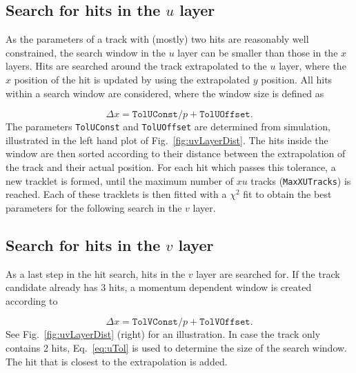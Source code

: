 \subsection[Search for hits in the $u$ layer]{Search for hits in the {\boldmath$u$} layer}
As the parameters of a track with (mostly) two hits are reasonably well
constrained, the search window in the $u$ layer can be smaller than 
those in the $x$ layers. Hits are searched around the track extrapolated to the
$u$ layer, where the $x$ position of the hit is updated by using the
extrapolated $y$ position. All hits within a search window are
considered, where the window size is defined as

\begin{equation}
\label{eq:uTol}
\Delta x =  \texttt{TolUConst} / p + \texttt{TolUOffset}.
\end{equation}
The parameters \texttt{TolUConst} and \texttt{TolUOffset} are determined
from simulation, illustrated in the left hand plot of Fig.~\ref{fig:uvLayerDist}.
The hits inside the window are then sorted according to their distance between the
extrapolation of the track and their actual position. For each hit which passes
this tolerance, a new tracklet is formed, until the maximum number of $xu$
tracks (\texttt{MaxXUTracks}) is reached. Each of these tracklets is then fitted
with a $\chi^{2}$ fit to obtain the best parameters for the following search in
the $v$ layer.


\subsection[Search for hits in the $v$ layer]{Search for hits in the {\boldmath$v$} layer}
As a last step in the hit search, hits in the $v$ layer are searched for. If the
track candidate already has 3 hits, a momentum dependent window is created
according to

\begin{equation}
\Delta x =  \texttt{TolVConst} / p + \texttt{TolVOffset}.
\end{equation}
See Fig.~\ref{fig:uvLayerDist} (right) for an illustration. In case the track only contains 2 hits,
Eq.~\ref{eq:uTol} is used to determine the size of the search window.
The hit that is closest to the extrapolation is added.


